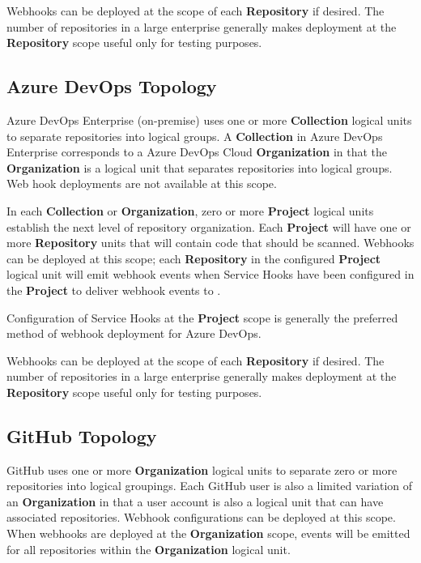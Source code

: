 Webhooks can be deployed at the scope of each \textbf{Repository} if desired.  The number of repositories
in a large enterprise generally makes deployment at the \textbf{Repository} scope useful
only for testing purposes.

\subsection{Azure DevOps Topology}

Azure DevOps Enterprise (on-premise) uses one or more \textbf{Collection} logical units to separate
repositories into logical groups.  A \textbf{Collection} in Azure DevOps Enterprise 
corresponds to a Azure DevOps Cloud \textbf{Organization} in that the \textbf{Organization} is a logical unit 
that separates repositories into logical groups. Web hook deployments are not available at this scope.

In each \textbf{Collection} or \textbf{Organization}, zero or more \textbf{Project} logical
units establish the next level of repository organization.  Each \textbf{Project} will 
have one or more \textbf{Repository} units that will contain code that should be scanned.  Webhooks
can be deployed at this scope; each \textbf{Repository} in the configured \textbf{Project} logical unit
will emit webhook events when Service Hooks have been configured in the \textbf{Project} to
deliver webhook events to \cxoneflow.

Configuration of Service Hooks at the \textbf{Project} scope is generally the preferred
method of webhook deployment for Azure DevOps.

Webhooks can be deployed at the scope of each \textbf{Repository} if desired.  The number of repositories
in a large enterprise generally makes deployment at the \textbf{Repository} scope useful
only for testing purposes.

\subsection{GitHub Topology}

GitHub uses one or more \textbf{Organization} logical units to separate zero or more
repositories into logical groupings. Each GitHub user is also a limited variation of an
\textbf{Organization} in that a user account is also a logical unit that can have
associated repositories.  Webhook configurations can be deployed at this scope.
When webhooks are deployed at the \textbf{Organization} scope, events
will be emitted for all repositories within the \textbf{Organization} logical unit.

